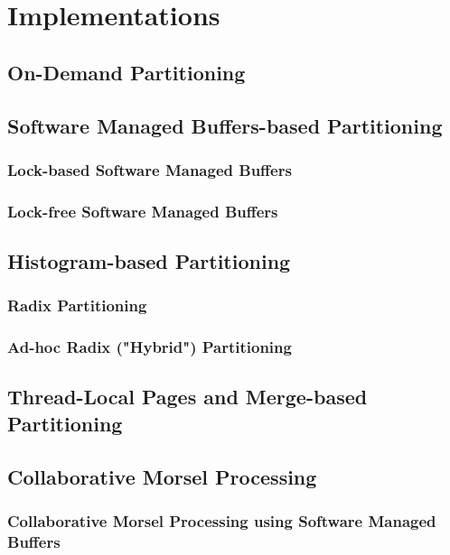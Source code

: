 
\chapter{Implementations}\label{chapter:implementations}
\section{On-Demand Partitioning}

\section{Software Managed Buffers-based Partitioning}
\subsection{Lock-based Software Managed Buffers}
\subsection{Lock-free Software Managed Buffers}

\section{Histogram-based Partitioning}
\subsection{Radix Partitioning}
\subsection{Ad-hoc Radix ("Hybrid") Partitioning}

\section{Thread-Local Pages and Merge-based Partitioning}

\section{Collaborative Morsel Processing}
\subsection{Collaborative Morsel Processing using Software Managed Buffers}
